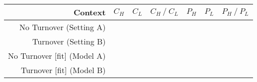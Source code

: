 \begin{tabular}{rcccccc}
	\toprule
  Context & $C_H$ & $C_L$ & $C_H~/~C_L$ & $P_H$ & $P_L$ & $P_H~/~P_L$\\\midrule
  No Turnover (Setting A) &
  
  & 
  & 
  & 
  & 
  & \textbf{}\\
  Turnover (Setting B) &
    
  & 
  & 
  & 
  & 
  & \textbf{}\\
  No Turnover [fit] (Model A) &
    
  & 
  & \textbf{}
  & 
  & 
  & \\
  Turnover [fit] (Model B) &
  
  & 
  & \textbf{}
  & 
  & 
  & \\
  \bottomrule
\end{tabular}